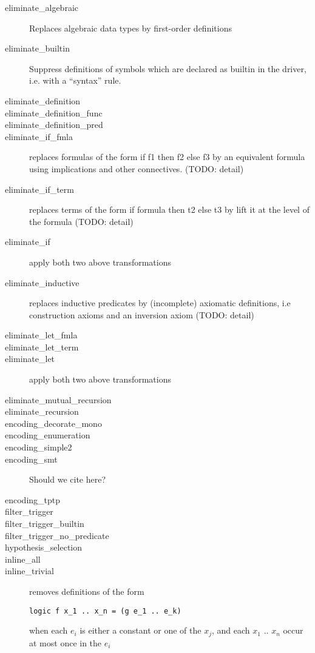 \begin{description}
\item[eliminate\_algebraic] Replaces algebraic data types by first-order
definitions~\cite{paskevich09rr}
\item[eliminate\_builtin] Suppress definitions of symbols which are
  declared as builtin in the driver, i.e. with a ``syntax'' rule.
  
\item[eliminate\_definition]
\item[eliminate\_definition\_func]
\item[eliminate\_definition\_pred]
\item[eliminate\_if\_fmla] replaces formulas of the form if f1 then f2
  else f3 by an equivalent formula using implications and other
  connectives. (TODO: detail)
\item[eliminate\_if\_term] replaces terms of the form if formula then
  t2 else t3 by lift it at the level of the formula (TODO: detail)
\item[eliminate\_if]
  apply both two above transformations
\item[eliminate\_inductive] replaces inductive predicates by
  (incomplete) axiomatic definitions, i.e construction axioms and an
  inversion axiom (TODO: detail)
\item[eliminate\_let\_fmla]
\item[eliminate\_let\_term]
\item[eliminate\_let]
  apply both two above transformations
\item[eliminate\_mutual\_recursion]
\item[eliminate\_recursion]
\item[encoding\_decorate\_mono]
\item[encoding\_enumeration]
\item[encoding\_simple2]
\item[encoding\_smt]
Should we cite \cite{conchon08smt} here?
\item[encoding\_tptp]
\item[filter\_trigger]
\item[filter\_trigger\_builtin]
\item[filter\_trigger\_no\_predicate]
\item[hypothesis\_selection]
\item[inline\_all]
\item[inline\_trivial]
  removes definitions of the form
\begin{verbatim}
logic f x_1 .. x_n = (g e_1 .. e_k)
\end{verbatim}
when each $e_i$ is either a constant or one of the $x_j$, and
each $x_1$ .. $x_n$ occur at most once in the $e_i$ 


\end{description}
